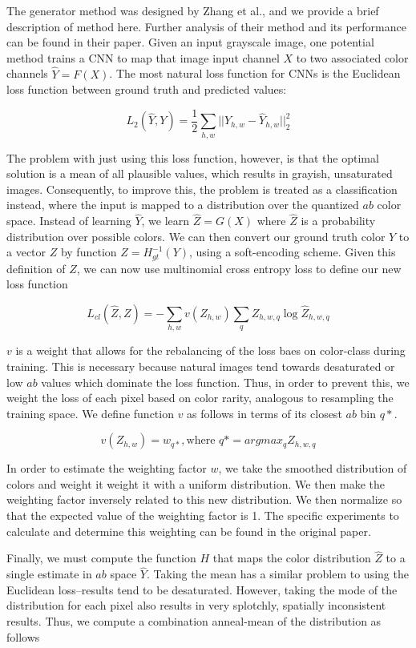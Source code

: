 \documentclass[10pt,twocolumn,letterpaper]{article}
\begin{document}
The generator method was designed by Zhang et al., and we provide a brief description of method here. Further analysis of their method and its performance can be found in their paper. Given an input grayscale image, one potential method trains a CNN to map that image input channel $X$ to two associated color channels $\hat{Y} = F(X)$. The most natural loss function for CNNs is the Euclidean loss function between ground truth and predicted values:

$$L_2(\hat{Y}, Y) = \frac{1}{2} \sum_{h,w} ||Y_{h,w} - \hat{Y}_{h,w}||_2^2$$

The problem with just using this loss function, however, is that the optimal solution is a mean of all plausible values, which results in grayish, unsaturated images. Consequently, to improve this, the problem is treated as a classification instead, where the input is mapped to a distribution over the quantized $ab$ color space. Instead of learning $\hat{Y}$, we learn $\hat{Z} = G(X)$ where $\hat{Z}$ is a probability distribution over possible colors. We can then convert our ground truth color $Y$ to a vector $Z$ by function $Z = H_{gt}^{-1}(Y)$, using a soft-encoding scheme. Given this definition of $Z$, we can now use multinomial cross entropy loss to define our new loss function

$$L_{cl}(\hat{Z}, Z) =  - \sum_{h,w}v(Z_{h,w})\sum_q Z_{h,w,q} \log{\hat{Z}_{h,w,q}}$$

$v$ is a weight that allows for the rebalancing of the loss baes on color-class during training. This is necessary because natural images tend towards desaturated or low $ab$ values which dominate the loss function. Thus, in order to prevent this, we weight the loss of each pixel based on color rarity, analogous to resampling the training space. We define function $v$ as follows in terms of its closest $ab$ bin $q*$.

$$v(Z_{h,w}) = w_{q*}, \text{where } q* = arg max_q Z_{h,w,q}$$

In order to estimate the weighting factor $w$, we take the smoothed distribution of colors and weight it weight it with a uniform distribution. We then make the weighting factor inversely related to this new distribution. We then normalize so that the expected value of the weighting factor is 1. The specific experiments to calculate and determine this weighting can be found in the original paper. 

Finally, we must compute the function $H$ that maps the color distribution $\hat{Z}$ to a single estimate in $ab$ space $\hat{Y}$. Taking the mean has a similar problem to using the Euclidean loss--results tend to be desaturated. However, taking the mode of the distribution for each pixel also results in very splotchly, spatially inconsistent results. Thus, we compute a combination anneal-mean of the distribution as follows
\end{document}
